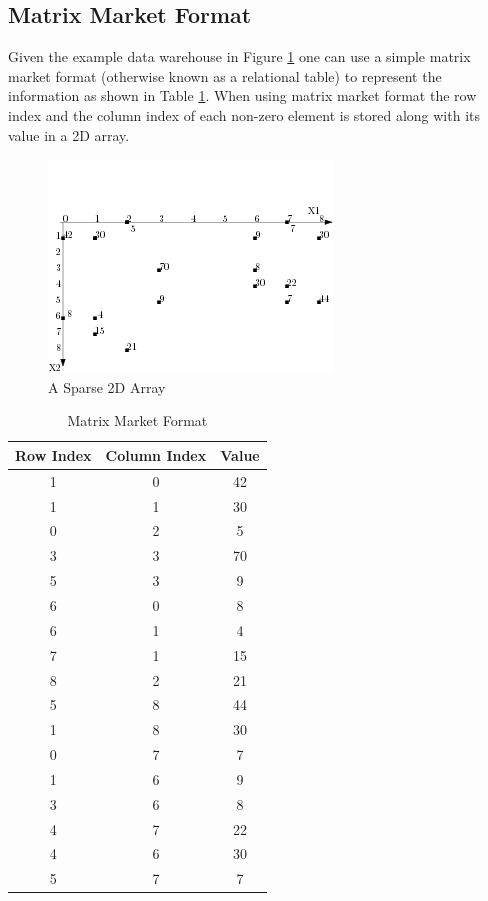 \subsection{Matrix Market Format}

Given the example data warehouse in Figure \ref{fig:exampleMatrix} one can use a simple matrix market format (otherwise known as a relational table) to represent the information as shown in Table \ref{tab:matrixmarket}. When using matrix market format the row index and the column index of each non-zero element is stored along with its value in a 2D array.

 \begin{figure}[H]
	\centering
	\includegraphics[width=0.7\linewidth]{exampleMatrix}
	\caption{A Sparse 2D Array}
	\label{fig:exampleMatrix}
\end{figure}

 \begin{table}[H]
	\caption{Matrix Market Format\label{tab:matrixmarket}}
	\begin{center}
		\begin{tabular}{ccc}
			\hline
			{\textbf{Row Index}} & {\textbf{Column Index}} & {\textbf{Value}}\\
			\hline
			1 & 0 & 42 \\
			1 & 1 & 30\\
			0 & 2 & 5\\
			3 & 3 & 70\\
			5 & 3 & 9\\
			6 & 0 & 8 \\
			6 & 1 & 4 \\
			7 & 1 & 15 \\
			8 & 2 & 21 \\
			5 & 8 & 44\\
			1 & 8 & 30\\
			0 & 7 & 7\\
			1 & 6 & 9\\
			3 & 6 & 8\\
			4 & 7 & 22\\
			4 & 6 & 30\\
			5 & 7 & 7 \\
			\hline
		\end{tabular}
	\end{center}
\end{table}

